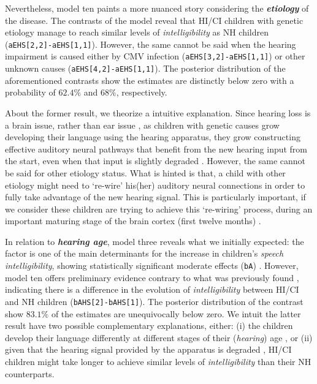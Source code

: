 Nevertheless, model ten paints a more nuanced story considering the \textbf{\textit{etiology}} of the disease. The contrasts of the model reveal that HI/CI children with genetic etiology manage to reach similar levels of \textit{intelligibility} as NH children (\texttt{aEHS[2,2]-aEHS[1,1]}). However, the same cannot be said when the hearing impairment is caused either by CMV infection (\texttt{aEHS[3,2]-aEHS[1,1]}) or other unknown causes (\texttt{aEHS[4,2]-aEHS[1,1]}). The posterior distribution of the aforementioned contrasts show the estimates are distinctly below zero with a probability of $62.4\%$ and $68\%$, respectively.

About the former result, we theorize a intuitive explanation. Since hearing loss is a brain issue, rather than ear issue \cite{Flexer_2011}, as children with genetic causes grow developing their language using the hearing apparatus, they grow constructing effective auditory neural pathways that benefit from the new hearing input from the start, even when that input is slightly degraded \cite{Drennan_et_al_2008}. However, the same cannot be said for other etiology status. What is hinted is that, a child with other etiology might need to `re-wire' his(her) auditory neural connections in order to fully take advantage of the new hearing signal. This is particularly important, if we consider these children are trying to achieve this `re-wiring' process, during an important maturing stage of the brain cortex (first twelve months) \cite{Flexer_2011}.

In relation to \textbf{\textit{hearing age}}, model three reveals what we initially expected: the factor is one of the main determinants for the increase in children's \textit{speech intelligibility}, showing statistically significant moderate effects (\texttt{bA}) \cite{Cohen_1988, Sawilowsky_2009}. However, model ten offers preliminary evidence contrary to what was previously found \cite{Boonen_et_al_2021}, indicating there is a difference in the evolution of \textit{intelligibility} between HI/CI and NH children (\texttt{bAHS[2]-bAHS[1]}). The posterior distribution of the contrast show $83.1\%$ of the estimates are unequivocally below zero. We intuit the latter result have two possible complementary explanations, either: (i) the children develop their language differently at different stages of their (\textit{hearing}) age \cite{Flexer_2011}, or (ii) given that the hearing signal provided by the apparatus is degraded \cite{Drennan_et_al_2008}, HI/CI children might take longer to achieve similar levels of \textit{intelligibility} than their NH counterparts.

